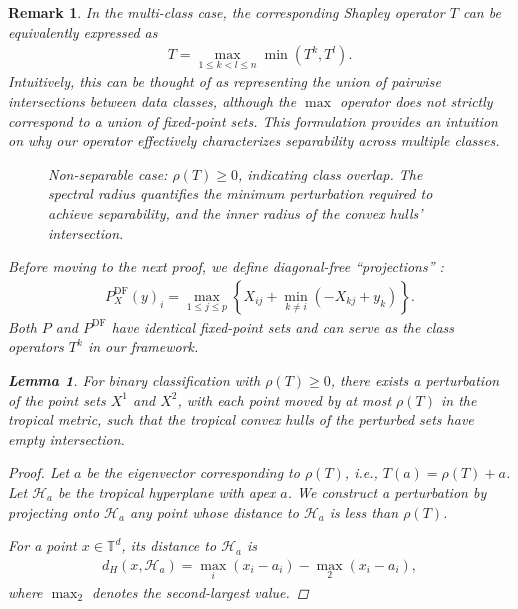 \documentclass{article}
\newtheorem{lemma}[theorem]{Lemma}
\newtheorem{remark}{Remark}
\newcommand{\trop}{\mathbb{T}}
\begin{document}
\begin{remark}
In the multi-class case, the corresponding Shapley operator $T$ can be equivalently expressed as
\begin{align}
T = \max_{1 \leq k < l \leq n}\min(T^k, T^l).
\end{align}
Intuitively, this can be thought of as representing the union of pairwise intersections between data classes, although the $\max$ operator does not strictly correspond to a union of fixed-point sets. This formulation provides an intuition on why our operator effectively characterizes separability across multiple classes.

\begin{figure}[htbp]
    \centering
    \resizebox{0.5\textwidth}{!}{\clipbox{0.15\width{} 0.15\height{} 0.15\width{} 0.15\height{}}{}}
    \caption{Non-separable case: $\rho(T) \geq 0$, indicating class overlap. The spectral radius quantifies the minimum perturbation required to achieve separability, and the inner radius of the convex hulls' intersection.}
    \label{fig:non_separable}
\end{figure}

Before moving to the next proof, we define diagonal-free ``projections'' \cite{gaubert2011}:
\begin{align}
P_X^{\text{DF}}(y)_i = \max_{1 \leq j \leq p} \left\{X_{ij} + \min_{k \neq i} (-X_{kj} + y_k)\right\}.
\end{align}
Both $P$ and $P^\text{DF}$ have identical fixed-point sets and can serve as the class operators $T^k$ in our framework.


\begin{lemma}\label{lemma:perturbation}
For binary classification with $\rho(T) \geq 0$, there exists a perturbation of the point sets $X^1$ and $X^2$, with each point moved by at most $\rho(T)$ in the tropical metric, such that the tropical convex hulls of the perturbed sets have empty intersection.
\end{lemma}

\begin{proof}
Let $a$ be the eigenvector corresponding to $\rho(T)$, i.e., $T(a) = \rho(T) + a$. Let $\mathcal{H}_a$ be the tropical hyperplane with apex $a$. We construct a perturbation by projecting onto $\mathcal{H}_a$ any point whose distance to $\mathcal{H}_a$ is less than $\rho(T)$.

For a point $x \in \trop^d$, its distance to $\mathcal{H}_a$ is
\begin{align}
d_H(x, \mathcal{H}_a) = \max_i(x_i - a_i) - \max_2(x_i - a_i),
\end{align}
where $\max_2$ denotes the second-largest value.


\end{proof}
\end{remark}
\end{document}
